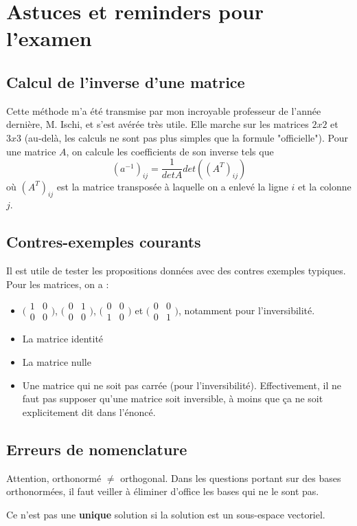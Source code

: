 \documentclass[10pt,a4paper]{book}
\begin{document}
\chapter{Astuces et reminders pour l'examen}
\section{Calcul de l'inverse d'une matrice}
Cette méthode m'a été transmise par mon incroyable professeur de l'année dernière, M. Ischi, et s'est avérée très utile. Elle marche sur les matrices $2x2$ et $3x3$ (au-delà, les calculs ne sont pas plus simples que la formule "officielle"). Pour une matrice $A$, on calcule les coefficients de son inverse tels que 
\[(a^{-1})_{ij} = \dfrac{1}{detA} det((A^T)_{ij})\]
où $(A^T)_{ij}$ est la matrice transposée à laquelle on a enlevé la ligne $i$ et la colonne $j$.

\section{Contres-exemples courants}
Il est utile de tester les propositions données avec des contres exemples typiques. Pour les matrices, on a :
\begin{itemize}
\item $\big(\begin{smallmatrix} 
1 & 0\\
0 & 0
\end{smallmatrix}\big)$, 
$\big(\begin{smallmatrix} 
0 & 1\\
0 & 0
\end{smallmatrix}\big)$, 
$\big(\begin{smallmatrix} 
0 & 0\\
1 & 0
\end{smallmatrix}\big)$ et  
$\big(\begin{smallmatrix} 
0 & 0\\
0 & 1
\end{smallmatrix}\big)$, notamment pour l'inversibilité.
\item La matrice identité
\item La matrice nulle
\item Une matrice qui ne soit pas carrée (pour l'inversibilité). Effectivement, il ne faut pas supposer qu'une matrice soit inversible, à moins que ça ne soit explicitement dit dans l'énoncé.
\end{itemize}

\section{Erreurs de nomenclature}
Attention, orthonormé $\neq$ orthogonal. Dans les questions portant sur des bases orthonormées, il faut veiller à éliminer d'office les bases qui ne le sont pas.\par 
Ce n'est pas une \textbf{unique} solution si la solution est un sous-espace vectoriel.
\end{document}
